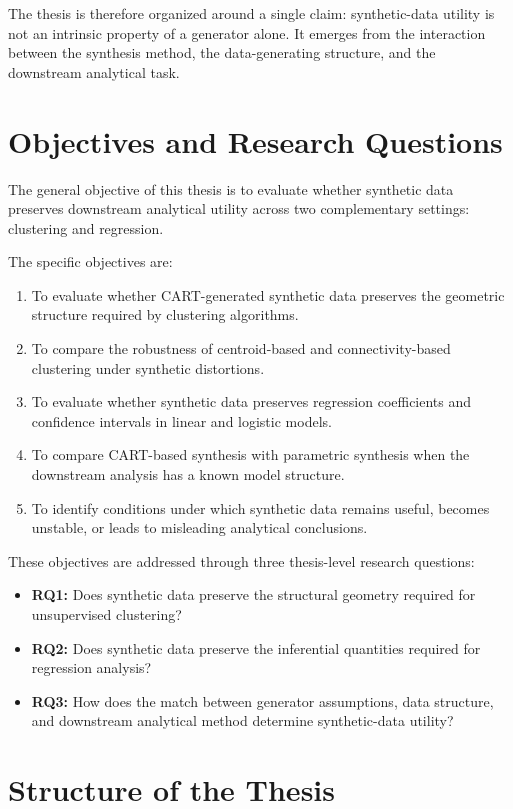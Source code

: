 The thesis is therefore organized around a single claim: synthetic-data utility is not an intrinsic property of a generator alone. It emerges from the interaction between the synthesis method, the data-generating structure, and the downstream analytical task.

\section{Objectives and Research Questions}
\label{sec:general-objectives}

The general objective of this thesis is to evaluate whether synthetic data preserves downstream analytical utility across two complementary settings: clustering and regression.

The specific objectives are:
\begin{enumerate}
  \item To evaluate whether CART-generated synthetic data preserves the geometric structure required by clustering algorithms.
  \item To compare the robustness of centroid-based and connectivity-based clustering under synthetic distortions.
  \item To evaluate whether synthetic data preserves regression coefficients and confidence intervals in linear and logistic models.
  \item To compare CART-based synthesis with parametric synthesis when the downstream analysis has a known model structure.
  \item To identify conditions under which synthetic data remains useful, becomes unstable, or leads to misleading analytical conclusions.
\end{enumerate}

These objectives are addressed through three thesis-level research questions:
\begin{itemize}
  \item \textbf{RQ1:} Does synthetic data preserve the structural geometry required for unsupervised clustering?
  \item \textbf{RQ2:} Does synthetic data preserve the inferential quantities required for regression analysis?
  \item \textbf{RQ3:} How does the match between generator assumptions, data structure, and downstream analytical method determine synthetic-data utility?
\end{itemize}

\section{Structure of the Thesis}
\label{sec:general-structure}

